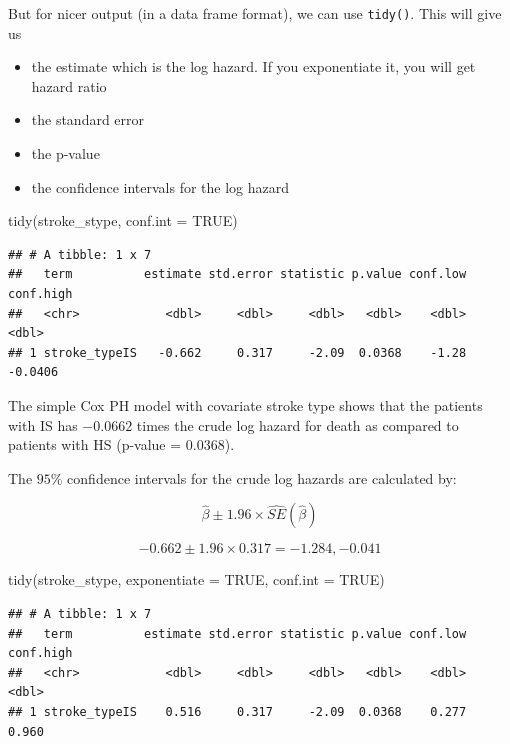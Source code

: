 \documentclass[
  10pt,
]{krantz}
\newenvironment{Shaded}{\begin{snugshade}}{\end{snugshade}}
\newcommand{\AttributeTok}[1]{\textcolor[rgb]{0.77,0.63,0.00}{#1}}
\newcommand{\ConstantTok}[1]{\textcolor[rgb]{0.00,0.00,0.00}{#1}}
\newcommand{\FunctionTok}[1]{\textcolor[rgb]{0.00,0.00,0.00}{#1}}
\newcommand{\NormalTok}[1]{#1}
\providecommand{\tightlist}{%
  \setlength{\itemsep}{0pt}\setlength{\parskip}{0pt}}
\begin{document}
But for nicer output (in a data frame format), we can use \texttt{tidy()}. This will give us

\begin{itemize}
\tightlist
\item
  the estimate which is the log hazard. If you exponentiate it, you will get hazard ratio
\item
  the standard error
\item
  the p-value
\item
  the confidence intervals for the log hazard
\end{itemize}

\begin{Shaded}
\begin{Highlighting}[]
\FunctionTok{tidy}\NormalTok{(stroke\_stype,}
     \AttributeTok{conf.int =} \ConstantTok{TRUE}\NormalTok{)}
\end{Highlighting}
\end{Shaded}

\begin{verbatim}
## # A tibble: 1 x 7
##   term          estimate std.error statistic p.value conf.low conf.high
##   <chr>            <dbl>     <dbl>     <dbl>   <dbl>    <dbl>     <dbl>
## 1 stroke_typeIS   -0.662     0.317     -2.09  0.0368    -1.28   -0.0406
\end{verbatim}

The simple Cox PH model with covariate stroke type shows that the patients with IS has \(-0.0662\) times the crude log hazard for death as compared to patients with HS (p-value = 0.0368).

The \(95\%\) confidence intervals for the crude log hazards are calculated by:

\[\hat\beta \pm 1.96 \times \widehat{SE}(\hat\beta)\]

\[-0.662 \pm 1.96 \times 0.317 = -1.284 , -0.041\]

\begin{Shaded}
\begin{Highlighting}[]
\FunctionTok{tidy}\NormalTok{(stroke\_stype, }
     \AttributeTok{exponentiate =} \ConstantTok{TRUE}\NormalTok{,}
     \AttributeTok{conf.int =} \ConstantTok{TRUE}\NormalTok{)}
\end{Highlighting}
\end{Shaded}

\begin{verbatim}
## # A tibble: 1 x 7
##   term          estimate std.error statistic p.value conf.low conf.high
##   <chr>            <dbl>     <dbl>     <dbl>   <dbl>    <dbl>     <dbl>
## 1 stroke_typeIS    0.516     0.317     -2.09  0.0368    0.277     0.960
\end{verbatim}
\end{document}
